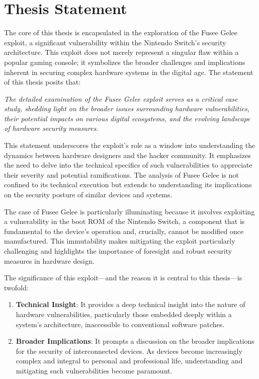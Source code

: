 \hypertarget{thesis-statement}{%
\section{Thesis Statement}\label{thesis-statement}}

The core of this thesis is encapsulated in the exploration of the Fusee
Gelee exploit, a significant vulnerability within the Nintendo Switch's
security architecture. This exploit does not merely represent a singular
flaw within a popular gaming console; it symbolizes the broader
challenges and implications inherent in securing complex hardware
systems in the digital age. The statement of this thesis posits that:

\emph{The detailed examination of the Fusee Gelee exploit serves as a
critical case study, shedding light on the broader issues surrounding
hardware vulnerabilities, their potential impacts on various digital
ecosystems, and the evolving landscape of hardware security measures.}

This statement underscores the exploit's role as a window into
understanding the dynamics between hardware designers and the hacker
community. It emphasizes the need to delve into the technical specifics
of such vulnerabilities to appreciate their severity and potential
ramifications. The analysis of Fusee Gelee is not confined to its
technical execution but extends to understanding its implications on the
security posture of similar devices and systems.

The case of Fusee Gelee is particularly illuminating because it involves
exploiting a vulnerability in the boot ROM of the Nintendo Switch, a
component that is fundamental to the device's operation and, crucially,
cannot be modified once manufactured. This immutability makes mitigating
the exploit particularly challenging and highlights the importance of
foresight and robust security measures in hardware design.

The significance of this exploit---and the reason it is central to this
thesis---is twofold:

\begin{enumerate}
\def\labelenumi{\arabic{enumi}.}
\item
  \textbf{Technical Insight}: It provides a deep technical insight into
  the nature of hardware vulnerabilities, particularly those embedded
  deeply within a system's architecture, inaccessible to conventional
  software patches.
\item
  \textbf{Broader Implications}: It prompts a discussion on the broader
  implications for the security of interconnected devices. As devices
  become increasingly complex and integral to personal and professional
  life, understanding and mitigating such vulnerabilities become
  paramount.
\end{enumerate}

